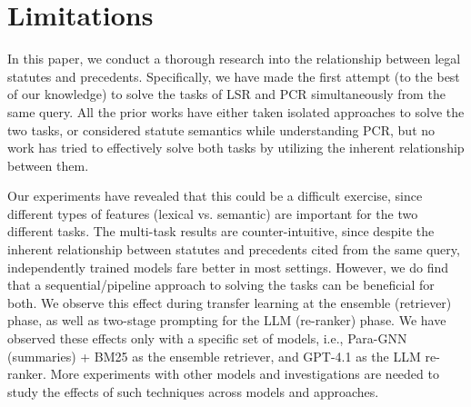 \section*{Limitations}

In this paper, we conduct a thorough research into the relationship between legal statutes and precedents. Specifically, we have made the first attempt (to the best of our knowledge) to solve the tasks of LSR and PCR simultaneously from the same query. All the prior works have either taken isolated approaches to solve the two tasks, or considered statute semantics while understanding PCR, but no work has tried to effectively solve both tasks by utilizing the inherent relationship between them. 

\noindent Our experiments have revealed that this could be a difficult exercise, since different types of features (lexical vs. semantic) are important for the two different tasks. The multi-task results are counter-intuitive, since despite the inherent relationship between statutes and precedents cited from the same query, independently trained models fare better in most settings. 
However, we do find that a sequential/pipeline approach to solving the tasks can be beneficial for both. We observe this effect during transfer learning at the ensemble (retriever) phase, as well as two-stage prompting for the LLM (re-ranker) phase. We have observed these effects only with a specific set of models, i.e., Para-GNN (summaries) + BM25 as the ensemble retriever, and GPT-4.1 as the LLM re-ranker. More experiments with other models and investigations are needed to study the effects of such techniques across models and approaches.


